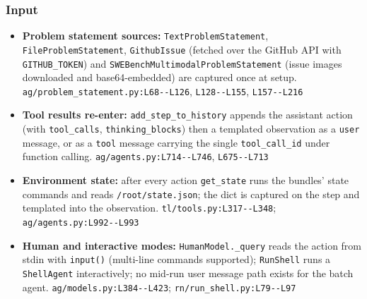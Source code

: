 \subsubsection*{Input}
\begin{itemize}
\item \textbf{Problem statement sources:} \texttt{TextProblemStatement}, \texttt{FileProblemStatement}, \texttt{GithubIssue} (fetched over the GitHub API with \texttt{GITHUB\_\allowbreak{}TOKEN}) and \texttt{SWEBenchMultimodalProblemStatement} (issue images downloaded and base64-embedded) are captured once at setup. \texttt{ag/\allowbreak{}problem\_\allowbreak{}statement.\allowbreak{}py:\allowbreak{}L68-\allowbreak{}-\allowbreak{}L126}, \texttt{L128-\allowbreak{}-\allowbreak{}L155}, \texttt{L157-\allowbreak{}-\allowbreak{}L216}
\item \textbf{Tool results re-enter:} \texttt{add\_\allowbreak{}step\_\allowbreak{}to\_\allowbreak{}history} appends the assistant action (with \texttt{tool\_\allowbreak{}calls}, \texttt{thinking\_\allowbreak{}blocks}) then a templated observation as a \texttt{user} message, or as a \texttt{tool} message carrying the single \texttt{tool\_\allowbreak{}call\_\allowbreak{}id} under function calling. \texttt{ag/\allowbreak{}agents.\allowbreak{}py:\allowbreak{}L714-\allowbreak{}-\allowbreak{}L746}, \texttt{L675-\allowbreak{}-\allowbreak{}L713}
\item \textbf{Environment state:} after every action \texttt{get\_\allowbreak{}state} runs the bundles' state commands and reads \texttt{/\allowbreak{}root/\allowbreak{}state.\allowbreak{}json}; the dict is captured on the step and templated into the observation. \texttt{tl/\allowbreak{}tools.\allowbreak{}py:\allowbreak{}L317-\allowbreak{}-\allowbreak{}L348}; \texttt{ag/\allowbreak{}agents.\allowbreak{}py:\allowbreak{}L992-\allowbreak{}-\allowbreak{}L993}
\item \textbf{Human and interactive modes:} \texttt{HumanModel.\allowbreak{}\_\allowbreak{}query} reads the action from stdin with \texttt{input(\allowbreak{})} (multi-line commands supported); \texttt{RunShell} runs a \texttt{ShellAgent} interactively; no mid-run user message path exists for the batch agent. \texttt{ag/\allowbreak{}models.\allowbreak{}py:\allowbreak{}L384-\allowbreak{}-\allowbreak{}L423}; \texttt{rn/\allowbreak{}run\_\allowbreak{}shell.\allowbreak{}py:\allowbreak{}L79-\allowbreak{}-\allowbreak{}L97}
\end{itemize}

